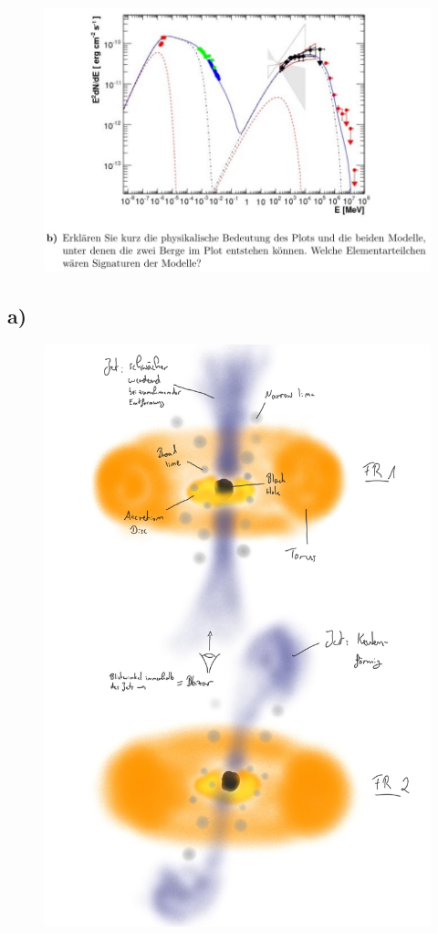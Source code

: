 \begin{figure}[H]
    \centering
    \includegraphics[width=\textwidth]{images/Aufgabe30b.jpg}
\end{figure}

\subsection{a)}

\begin{figure}[H]
    \centering
    \includegraphics[width=\textwidth]{images/30a.jpg}
\end{figure}

